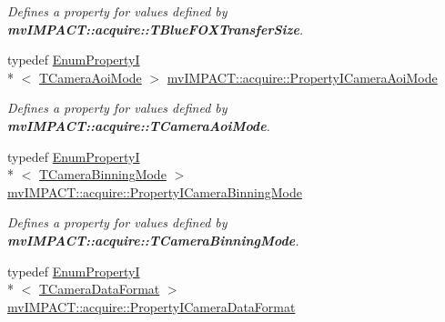 \begin{DoxyCompactItemize}
\begin{DoxyCompactList}\small\item\em Defines a property for values defined by {\bfseries mv\+I\+M\+P\+A\+C\+T\+::acquire\+::\+T\+Blue\+F\+O\+X\+Transfer\+Size}. \end{DoxyCompactList}\item 
\hypertarget{group___device_specific_interface_gac3481ade98270de3d8aa7ae47cbe5c4e}{typedef \hyperlink{classmv_i_m_p_a_c_t_1_1acquire_1_1_enum_property_i}{Enum\+Property\+I}\\*
$<$ \hyperlink{group___device_specific_interface_gaab13c0272df6eebe71ee4b8f45796cd3}{T\+Camera\+Aoi\+Mode} $>$ \hyperlink{group___device_specific_interface_gac3481ade98270de3d8aa7ae47cbe5c4e}{mv\+I\+M\+P\+A\+C\+T\+::acquire\+::\+Property\+I\+Camera\+Aoi\+Mode}}\label{group___device_specific_interface_gac3481ade98270de3d8aa7ae47cbe5c4e}

\begin{DoxyCompactList}\small\item\em Defines a property for values defined by {\bfseries mv\+I\+M\+P\+A\+C\+T\+::acquire\+::\+T\+Camera\+Aoi\+Mode}. \end{DoxyCompactList}\item 
\hypertarget{group___device_specific_interface_ga416d63b8d5d2dd2e5fabd253db5f8efc}{typedef \hyperlink{classmv_i_m_p_a_c_t_1_1acquire_1_1_enum_property_i}{Enum\+Property\+I}\\*
$<$ \hyperlink{group___device_specific_interface_ga915d7e18807e69567ac466541b66313b}{T\+Camera\+Binning\+Mode} $>$ \hyperlink{group___device_specific_interface_ga416d63b8d5d2dd2e5fabd253db5f8efc}{mv\+I\+M\+P\+A\+C\+T\+::acquire\+::\+Property\+I\+Camera\+Binning\+Mode}}\label{group___device_specific_interface_ga416d63b8d5d2dd2e5fabd253db5f8efc}

\begin{DoxyCompactList}\small\item\em Defines a property for values defined by {\bfseries mv\+I\+M\+P\+A\+C\+T\+::acquire\+::\+T\+Camera\+Binning\+Mode}. \end{DoxyCompactList}\item 
\hypertarget{group___device_specific_interface_gaca0c18e83412eef14a2be9fdc89066b6}{typedef \hyperlink{classmv_i_m_p_a_c_t_1_1acquire_1_1_enum_property_i}{Enum\+Property\+I}\\*
$<$ \hyperlink{group___common_interface_ga36f9b405563c51f817554819cf981699}{T\+Camera\+Data\+Format} $>$ \hyperlink{group___device_specific_interface_gaca0c18e83412eef14a2be9fdc89066b6}{mv\+I\+M\+P\+A\+C\+T\+::acquire\+::\+Property\+I\+Camera\+Data\+Format}}\label{group___device_specific_interface_gaca0c18e83412eef14a2be9fdc89066b6}


\end{DoxyCompactItemize}
